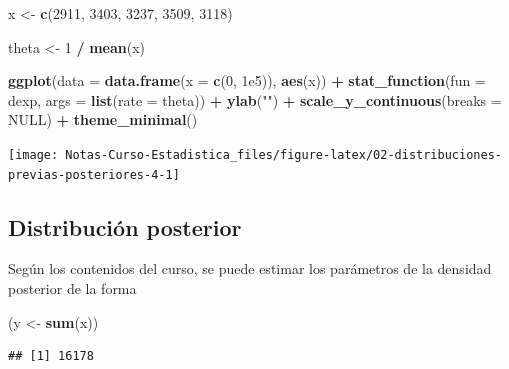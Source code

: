 \documentclass[
  12pt,
]{book}
\newenvironment{Shaded}{\begin{snugshade}}{\end{snugshade}}
\newcommand{\DataTypeTok}[1]{\textcolor[rgb]{0.13,0.29,0.53}{#1}}
\newcommand{\DecValTok}[1]{\textcolor[rgb]{0.00,0.00,0.81}{#1}}
\newcommand{\FloatTok}[1]{\textcolor[rgb]{0.00,0.00,0.81}{#1}}
\newcommand{\KeywordTok}[1]{\textcolor[rgb]{0.13,0.29,0.53}{\textbf{#1}}}
\newcommand{\NormalTok}[1]{#1}
\newcommand{\OperatorTok}[1]{\textcolor[rgb]{0.81,0.36,0.00}{\textbf{#1}}}
\newcommand{\OtherTok}[1]{\textcolor[rgb]{0.56,0.35,0.01}{#1}}
\newcommand{\StringTok}[1]{\textcolor[rgb]{0.31,0.60,0.02}{#1}}
\begin{document}
\begin{Shaded}
\begin{Highlighting}[]
\NormalTok{x  \textless{}{-}}\StringTok{ }\KeywordTok{c}\NormalTok{(}\DecValTok{2911}\NormalTok{, }\DecValTok{3403}\NormalTok{, }\DecValTok{3237}\NormalTok{, }\DecValTok{3509}\NormalTok{, }\DecValTok{3118}\NormalTok{)}

\NormalTok{theta \textless{}{-}}\StringTok{ }\DecValTok{1} \OperatorTok{/}\StringTok{ }\KeywordTok{mean}\NormalTok{(x)}

\KeywordTok{ggplot}\NormalTok{(}\DataTypeTok{data =} \KeywordTok{data.frame}\NormalTok{(}\DataTypeTok{x =} \KeywordTok{c}\NormalTok{(}\DecValTok{0}\NormalTok{, }\FloatTok{1e5}\NormalTok{)), }\KeywordTok{aes}\NormalTok{(x)) }\OperatorTok{+}
\StringTok{  }\KeywordTok{stat\_function}\NormalTok{(}\DataTypeTok{fun =}\NormalTok{ dexp, }\DataTypeTok{args =} \KeywordTok{list}\NormalTok{(}\DataTypeTok{rate =}\NormalTok{ theta)) }\OperatorTok{+}
\StringTok{  }\KeywordTok{ylab}\NormalTok{(}\StringTok{""}\NormalTok{) }\OperatorTok{+}
\StringTok{  }\KeywordTok{scale\_y\_continuous}\NormalTok{(}\DataTypeTok{breaks =} \OtherTok{NULL}\NormalTok{) }\OperatorTok{+}
\StringTok{  }\KeywordTok{theme\_minimal}\NormalTok{()}
\end{Highlighting}
\end{Shaded}

\begin{center}\texttt{[image: Notas-Curso-Estadistica\_files/figure-latex/02-distribuciones-previas-posteriores-4-1]} \end{center}

\hypertarget{distribuciuxf3n-posterior}{%
\subsection{Distribución posterior}\label{distribuciuxf3n-posterior}}

Según los contenidos del curso, se puede estimar los parámetros de la densidad posterior de la forma

\begin{Shaded}
\begin{Highlighting}[]
\NormalTok{(y  \textless{}{-}}\StringTok{ }\KeywordTok{sum}\NormalTok{(x))}
\end{Highlighting}
\end{Shaded}

\begin{verbatim}
## [1] 16178
\end{verbatim}
\end{document}
